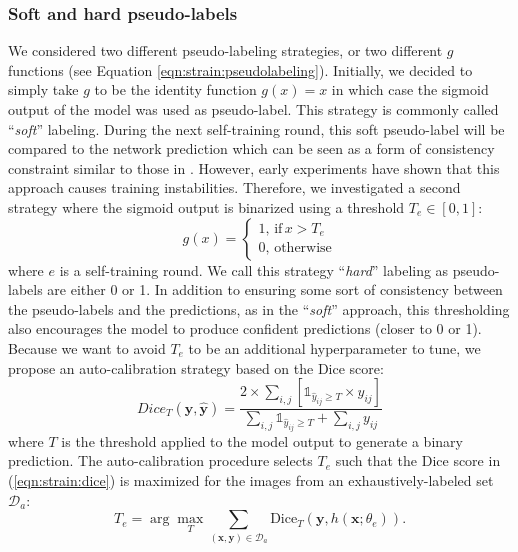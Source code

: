 \subsubsection{Soft and hard pseudo-labels}
\label{sssec:strain:softandhardlabels}

We considered two different pseudo-labeling strategies, or two different $g$ functions (see Equation \ref{eqn:strain:pseudolabeling}). Initially, we decided to simply take $g$ to be the identity function $g(x) = x$ in which case the sigmoid output of the model was used as pseudo-label. This strategy is commonly called  ``\textit{soft}'' labeling. During the next self-training round, this soft pseudo-label will be compared to the network prediction which can be seen as a form of consistency constraint similar to those in \cite{laine2016temporal,tarvainen2017mean,sohn2020fixmatch}. However, early experiments have shown that this approach causes training instabilities. Therefore, we investigated a second strategy where the sigmoid output is binarized using a threshold $T_e \in [0, 1]$:
\begin{equation}
g(x) = \begin{cases}
1,\,\text{if}\, x > T_e\\
0,\,\text{otherwise}
\end{cases}
\end{equation}   
where $e$ is a self-training round. We call this strategy ``\textit{hard}'' labeling as pseudo-labels are either 0 or 1. In addition to ensuring some sort of consistency between the pseudo-labels and the predictions, as in the ``\textit{soft}'' approach, this thresholding also encourages the model to produce confident predictions (closer to 0 or 1). Because we want to avoid $T_e$ to be an additional hyperparameter to tune, we propose an auto-calibration strategy based on the Dice score: 
\begin{equation}
  Dice_T(\mathbf{y},\hat{\mathbf{y}}) = \dfrac{2 \times \sum_{i,j} \left[\mathbb{1}_{\hat{y}_{ij} \geq T} \times y_{ij}\right]}{\sum_{i,j} \mathbb{1}_{\hat{y}_{ij} \geq T} + \sum_{i,j} y_{ij}}
  \label{eqn:strain:dice}
\end{equation}
where $T$ is the threshold applied to the model output to generate a binary prediction. The auto-calibration procedure selects $T_e$ such that the Dice score in (\ref{eqn:strain:dice}) is maximized for the images from an exhaustively-labeled set  $\mathcal{D}_{a}$:
\begin{equation}
T_e = \arg \underset{T}{\max} \sum_{(\mathbf{x}, \mathbf{y}) \in \mathcal{D}_a} \text{Dice}_T\left(\mathbf{y},h( \mathbf{x}; \theta_{e})\right).
\label{eqn:strain:thresholdopt}
\end{equation}
